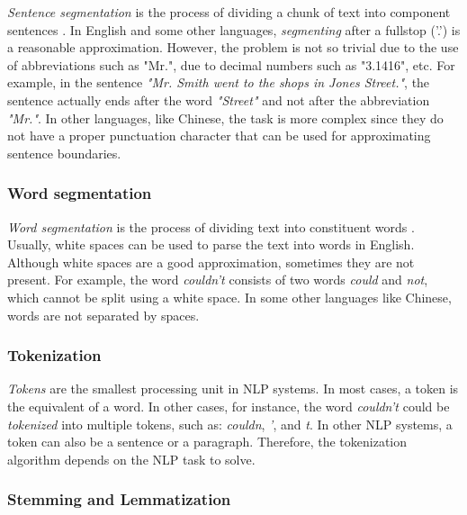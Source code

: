 \textit{Sentence segmentation} is the process of dividing a chunk of text into component sentences \cite{wiki:sentSeg}. In English and some other languages, \emph{segmenting} after a fullstop ('.') is a reasonable approximation. However, the problem is not so trivial due to the use of abbreviations such as "Mr.", due to decimal numbers such as "3.1416", etc. For example, in the sentence \textit{"Mr. Smith went to the shops in Jones Street."}, the sentence actually ends after the word \textit{"Street"} and not after the abbreviation \textit{"Mr."}. In other languages, like Chinese, the task is more complex since they do not have a proper punctuation character that can be used for approximating sentence boundaries.

\subsubsection{Word segmentation}


\textit{Word segmentation} is the process of dividing text into constituent words \cite{wiki:sentSeg}. Usually, white spaces can be used to parse the text into words in English. Although white spaces are a good approximation, sometimes they are not present. For example, the word \textit{couldn't} consists of two words \textit{could} and \textit{not}, which cannot be split using a white space. In some other languages like Chinese, words are not separated by spaces.

\subsubsection{Tokenization}

\emph{Tokens} are the smallest processing unit in NLP systems. In most cases, a token is the equivalent of a word. In other cases, for instance, the word \textit{couldn't} could be \emph{tokenized} into multiple tokens, such as: \textit{couldn}, \textit{'}, and \textit{t}. In other NLP systems, a token can also be a sentence or a paragraph. Therefore, the tokenization algorithm depends on the NLP task to solve.

\subsubsection{Stemming and Lemmatization}

